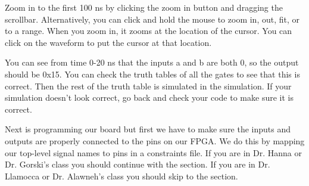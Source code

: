 \begin{center}
\end{center}

Zoom in to the first 100 ns by clicking the zoom in button and dragging the scrollbar.
Alternatively, you can click and hold the mouse to zoom in, out, fit, or to a range.
When you zoom in, it zooms at the location of the cursor.
You can click on the waveform to put the cursor at that location.

\begin{center}
\end{center}

You can see from time 0-20 ns that the inputs a and b are both 0, so the output should be 0x15.
You can check the truth tables of all the gates to see that this is correct.
Then the rest of the truth table is simulated in the simulation.
If your simulation doesn't look correct, go back and check your code to make sure it is correct.

Next is programming our board but first we have to make sure the inputs and outputs are properly
connected to the pins on our FPGA.
We do this by mapping our top-level signal names to pins in a constraints file.
If you are in Dr. Hanna or Dr. Gorski's class you should continue with the
 section.
If you are in Dr. Llamocca or Dr. Alawneh's class you should skip to the  section.

